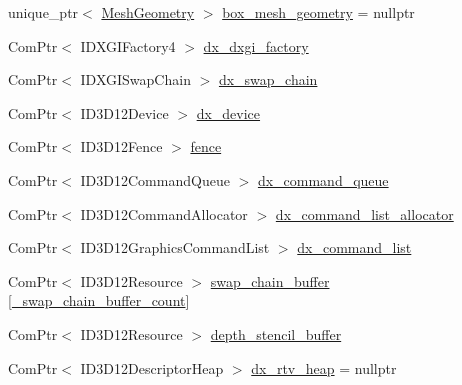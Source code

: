 \begin{DoxyCompactItemize}
\item 
unique\+\_\+ptr$<$ \hyperlink{struct_mesh_geometry}{Mesh\+Geometry} $>$ \hyperlink{class_direct_x_renderer_a834f2538756929aa9744cee706dae4e9_a834f2538756929aa9744cee706dae4e9}{box\+\_\+mesh\+\_\+geometry} = nullptr
\item 
Com\+Ptr$<$ I\+D\+X\+G\+I\+Factory4 $>$ \hyperlink{class_direct_x_renderer_a514dd6a49f675b0b1f05eeb5df61e688_a514dd6a49f675b0b1f05eeb5df61e688}{dx\+\_\+dxgi\+\_\+factory}
\item 
Com\+Ptr$<$ I\+D\+X\+G\+I\+Swap\+Chain $>$ \hyperlink{class_direct_x_renderer_adb032dd1c2a1add393fe9f6e73770e68_adb032dd1c2a1add393fe9f6e73770e68}{dx\+\_\+swap\+\_\+chain}
\item 
Com\+Ptr$<$ I\+D3\+D12\+Device $>$ \hyperlink{class_direct_x_renderer_a665ce2d16dd1e15e4e3f7ecef3c5b11a_a665ce2d16dd1e15e4e3f7ecef3c5b11a}{dx\+\_\+device}
\item 
Com\+Ptr$<$ I\+D3\+D12\+Fence $>$ \hyperlink{class_direct_x_renderer_a9f2cdba34c8670e6ec1f686b362ab700_a9f2cdba34c8670e6ec1f686b362ab700}{fence}
\item 
Com\+Ptr$<$ I\+D3\+D12\+Command\+Queue $>$ \hyperlink{class_direct_x_renderer_a8b99048329168c87d7ef207698caeddc_a8b99048329168c87d7ef207698caeddc}{dx\+\_\+command\+\_\+queue}
\item 
Com\+Ptr$<$ I\+D3\+D12\+Command\+Allocator $>$ \hyperlink{class_direct_x_renderer_a885e10b057d3e1d3f2c76045e567887e_a885e10b057d3e1d3f2c76045e567887e}{dx\+\_\+command\+\_\+list\+\_\+allocator}
\item 
Com\+Ptr$<$ I\+D3\+D12\+Graphics\+Command\+List $>$ \hyperlink{class_direct_x_renderer_a5bdea06c9f3fa2af49413a70f39bc0fb_a5bdea06c9f3fa2af49413a70f39bc0fb}{dx\+\_\+command\+\_\+list}
\item 
Com\+Ptr$<$ I\+D3\+D12\+Resource $>$ \hyperlink{class_direct_x_renderer_ad8a4b2130a07748ce0c503fe9c9c7d14_ad8a4b2130a07748ce0c503fe9c9c7d14}{swap\+\_\+chain\+\_\+buffer} \mbox{[}\hyperlink{class_direct_x_renderer_aaf675ecf10cb34d5247f78920f8851da_aaf675ecf10cb34d5247f78920f8851da}{\+\_\+swap\+\_\+chain\+\_\+buffer\+\_\+count}\mbox{]}
\item 
Com\+Ptr$<$ I\+D3\+D12\+Resource $>$ \hyperlink{class_direct_x_renderer_a624b17abc05948ba9fed5571bb91187a_a624b17abc05948ba9fed5571bb91187a}{depth\+\_\+stencil\+\_\+buffer}
\item 
Com\+Ptr$<$ I\+D3\+D12\+Descriptor\+Heap $>$ \hyperlink{class_direct_x_renderer_a082c69eafb2449e5f19efb156fa0c0e8_a082c69eafb2449e5f19efb156fa0c0e8}{dx\+\_\+rtv\+\_\+heap} = nullptr

\end{DoxyCompactItemize}
